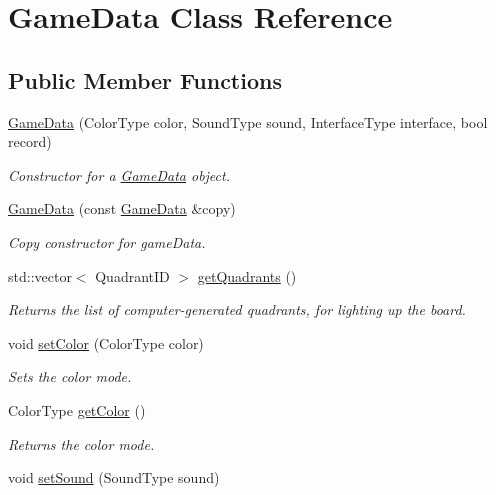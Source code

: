 \hypertarget{class_game_data}{\section{Game\+Data Class Reference}
\label{class_game_data}
}
\subsection*{Public Member Functions}
\begin{DoxyCompactItemize}
\item 
\hyperlink{class_game_data_a8c73a044b7ba43644537c4cb35467cc1}{Game\+Data} (Color\+Type color, Sound\+Type sound, Interface\+Type interface, bool record)
\begin{DoxyCompactList}\small\item\em Constructor for a \hyperlink{class_game_data}{Game\+Data} object. \end{DoxyCompactList}\item 
\hyperlink{class_game_data_ade80a231566a4b58f92f827a1e58adb3}{Game\+Data} (const \hyperlink{class_game_data}{Game\+Data} \&copy)
\begin{DoxyCompactList}\small\item\em Copy constructor for game\+Data. \end{DoxyCompactList}\item 
std\+::vector$<$ Quadrant\+I\+D $>$ \hyperlink{class_game_data_a317328ad1f60e9dd77eedf17286a675d}{get\+Quadrants} ()
\begin{DoxyCompactList}\small\item\em Returns the list of computer-\/generated quadrants, for lighting up the board. \end{DoxyCompactList}\item 
void \hyperlink{class_game_data_a9150480b6cc0e21a903bcb3495e2a7c6}{set\+Color} (Color\+Type color)
\begin{DoxyCompactList}\small\item\em Sets the color mode. \end{DoxyCompactList}\item 
Color\+Type \hyperlink{class_game_data_a89dd07232c691ff7c78389cb723ac1f3}{get\+Color} ()
\begin{DoxyCompactList}\small\item\em Returns the color mode. \end{DoxyCompactList}\item 
void \hyperlink{class_game_data_a3952832c1ddaa86eca0aee1945e4b69d}{set\+Sound} (Sound\+Type sound)

\end{DoxyCompactItemize}
